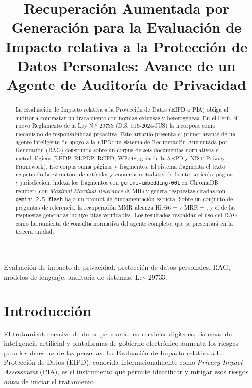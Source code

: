 \documentclass[conference]{IEEEtran}
\begin{document}
\title{Recuperación Aumentada por Generación para la Evaluación de Impacto relativa a la Protección de Datos Personales: Avance de un Agente de Auditoría de Privacidad}

\author{
}

\maketitle

\begin{abstract}
La Evaluación de Impacto relativa a la Protección de Datos (EIPD o PIA) obliga al auditor a contrastar un tratamiento con normas extensas y heterogéneas. En el Perú, el nuevo Reglamento de la Ley N.º 29733 (D.S. 016-2024-JUS) la incorpora como mecanismo de responsabilidad proactiva. Este artículo presenta el primer avance de un agente inteligente de apoyo a la EIPD: un sistema de Recuperación Aumentada por Generación (RAG) construido sobre un corpus de seis documentos normativos y metodológicos (LPDP, RLPDP, RGPD, WP248, guía de la AEPD y NIST Privacy Framework). Ese corpus suma \NumPaginas{} páginas y \NumFragmentos{} fragmentos. El sistema fragmenta el texto respetando la estructura de artículos y conserva metadatos de fuente, artículo, página y jurisdicción. Indexa los fragmentos con \texttt{gemini-embedding-001} en ChromaDB, recupera con \emph{Maximal Marginal Relevance} (MMR) y genera respuestas citadas con \texttt{gemini-2.5-flash} bajo un prompt de fundamentación estricta. Sobre un conjunto de \NumPreguntas{} preguntas de referencia, la recuperación MMR alcanza Hit@6 = \HitMMR{} y MRR = \MrrMMR{}, y el \PctCitas{} de las respuestas generadas incluye citas verificables. Los resultados respaldan el uso del RAG como herramienta de consulta normativa del agente completo, que se presentará en la tercera unidad.
\end{abstract}

\begin{IEEEkeywords}
Evaluación de impacto de privacidad, protección de datos personales, RAG, modelos de lenguaje, auditoría de sistemas, Ley 29733.
\end{IEEEkeywords}

\section{Introducción}
El tratamiento masivo de datos personales en servicios digitales, sistemas de inteligencia artificial y plataformas de gobierno electrónico aumenta los riesgos para los derechos de las personas. La Evaluación de Impacto relativa a la Protección de Datos (EIPD), conocida internacionalmente como \emph{Privacy Impact Assessment} (PIA), es el instrumento que permite identificar y mitigar esos riesgos \emph{antes} de iniciar el tratamiento \cite{clarke2009pia,wright2012pia}.
\end{document}
